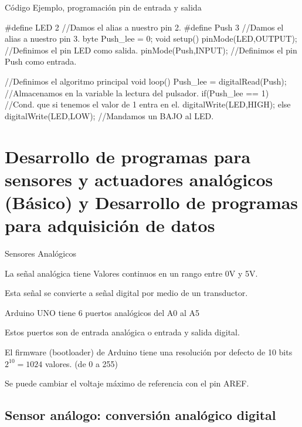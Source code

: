 \documentclass{beamer}
\begin{document}
\begin{frame}[fragile]
{Código Ejemplo, programación pin de entrada y salida}


\tiny

\begin{verbatimtab}

#define LED 2  //Damos el alias a nuestro pin 2.
#define Push 3 //Damos el alias a nuestro pin 3.
byte Push_lee = 0;
void setup(){
	pinMode(LED,OUTPUT); //Definimos el pin LED como salida. 
	pinMode(Push,INPUT); //Definimos el pin Push como entrada. 
}

//Definimos el algoritmo principal
void loop(){
		Push_lee = digitalRead(Push); //Almacenamos en la variable la lectura del 	pulsador.
	if(Push_lee == 1){ 			//Cond. que si tenemos el valor de 1 entra en el.
		digitalWrite(LED,HIGH); 
	}else{
		digitalWrite(LED,LOW); //Mandamos un BAJO al LED.
	}
}

\end{verbatimtab}

\end{frame}


\section{Desarrollo de programas para sensores y actuadores analógicos (Básico) y Desarrollo de programas para adquisici\'on de datos}


\begin{frame}{Sensores Analógicos}

La señal analógica tiene Valores continuos en un rango entre 0V y 5V.

Esta señal se convierte  a señal digital por medio de un transductor.

Arduino UNO tiene 6 puertos analógicos del A0 al A5

Estos puertos son de entrada analógica o entrada y salida digital.

El firmware (bootloader) de Arduino tiene una resolución por defecto de 10 bits $2^{10}=1024$ valores. (de 0 a 255)

Se puede cambiar el voltaje máximo de referencia con el pin AREF.

\end{frame}

\subsection{Sensor análogo: conversión analógico digital}
\end{document}
